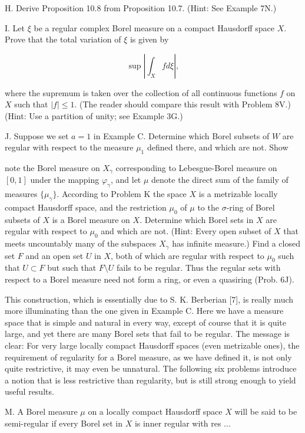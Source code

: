 H. Derive Proposition 10.8 from Proposition 10.7. (Hint: See Example 7N.)

I. Let $\xi$ be a regular complex Borel measure on a compact Hausdorff space $X$. Prove that the total variation of $\xi$ is given by

$$\sup \left| \int_X f d\xi \right|,$$

where the supremum is taken over the collection of all continuous functions $f$ on $X$ such that $|f| \leq 1$. (The reader should compare this result with Problem 8V.) (Hint: Use a partition of unity; see Example 3G.)

J. Suppose we set $a = 1$ in Example C. Determine which Borel subsets of $W$ are regular with respect to the measure $\mu_1$ defined there, and which are not. Show

note the Borel measure on $X_{\gamma}$ corresponding to Lebesgue-Borel measure on $[0, 1]$ under the mapping $\varphi_{\gamma}$, and let $\mu$ denote the direct sum of the family of measures $\{\mu_{\gamma}\}$. According to Problem K the space $X$ is a metrizable locally compact Hausdorff space, and the restriction $\mu_0$ of $\mu$ to the $\sigma$-ring of Borel subsets of $X$ is a Borel measure on $X$. Determine which Borel sets in $X$ are regular with respect to $\mu_0$ and which are not. (Hint: Every open subset of $X$ that meets uncountably many of the subspaces $X_{\gamma}$ has infinite measure.) Find a closed set $F$ and an open set $U$ in $X$, both of which are regular with respect to $\mu_0$ such that $U \subset F$ but such that $F \setminus U$ fails to be regular. Thus the regular sets with respect to a Borel measure need not form a ring, or even a quasiring (Prob. 6J).

This construction, which is essentially due to S. K. Berberian [7], is really much more illuminating than the one given in Example C. Here we have a measure space that is simple and natural in every way, except of course that it is quite large, and yet there are many Borel sets that fail to be regular. The message is clear: For very large locally compact Hausdorff spaces (even metrizable ones), the requirement of regularity for a Borel measure, as we have defined it, is not only quite restrictive, it may even be unnatural. The following six problems introduce a notion that is less restrictive than regularity, but is still strong enough to yield useful results.

M. A Borel measure $\mu$ on a locally compact Hausdorff space $X$ will be said to be semi-regular if every Borel set in $X$ is inner regular with res
...
